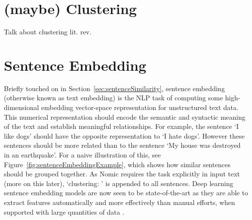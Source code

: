 \documentclass[10pt,oneside]{report}
\begin{document}
\section{(maybe) Clustering}
Talk about clustering lit. rev.


\section{Sentence Embedding}\label{sec:sentenceEmbedding}
Briefly touched on in Section~\ref{sec:sentenceSimilarity}, sentence embedding (otherwise known as text embedding) is the NLP task of computing some high-dimensional embedding vector-space representation for unstructured text data. This numerical representation should encode the semantic and syntactic meaning of the text and establish meaningful relationships. For example, the sentence `I like dogs' should have the opposite representation to `I hate dogs'.  However these sentences should be more related than to the sentence `My house was destroyed in an earthquake'. For a naive illustration of this, see Figure~\ref{fig:sentenceEmbeddingExample}, which shows how similar sentences should be grouped together. As Nomic requires the task explicitly in input text (more on this later), `clustering: ' is appended to all sentences. Deep learning sentence embedding models are now seen to be state-of-the-art as they are able to extract features automatically and more effectively than manual efforts, when supported with large quantities of data \cite{liang2017text}.
\end{document}
